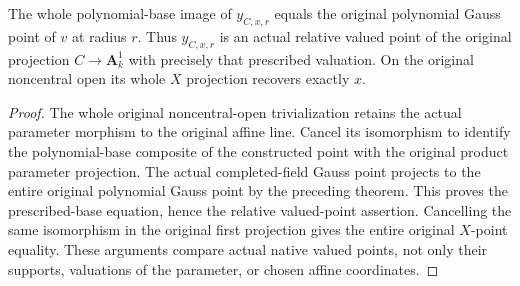 \begin{theorem}\label{thm:native-test-configuration-gauss-point-base}
\leanok
The whole polynomial-base image of $y_{C,x,r}$ equals the original
polynomial Gauss point of $v$ at radius $r$. Thus $y_{C,x,r}$ is an actual
relative valued point of the original projection $C\to\mathbf A^1_k$
with precisely that prescribed valuation. On the original noncentral
open its whole $X$ projection recovers exactly $x$.
\end{theorem}
\begin{proof}
The whole original noncentral-open trivialization retains the actual
parameter morphism to the original affine line. Cancel its isomorphism
to identify the polynomial-base composite of the constructed point
with the original product parameter projection. The actual completed-field
Gauss point projects to the entire original polynomial Gauss point by the
preceding theorem. This proves the prescribed-base equation, hence the
relative valued-point assertion. Cancelling the same isomorphism in the
original first projection gives the entire original $X$-point equality.
These arguments compare actual native valued points, not only their
supports, valuations of the parameter, or chosen affine coordinates.
\end{proof}
